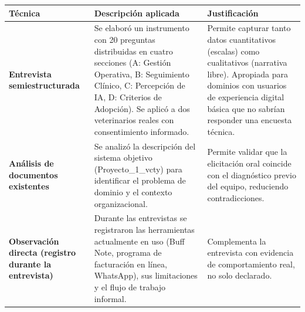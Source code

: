 \documentclass[
]{article}
\newcounter{none} %
\begin{document}
{\def\LTcaptype{none} %
\begin{longtable}[]{|
  >{\raggedright\arraybackslash}p{}|
  >{\raggedright\arraybackslash}p{}|
  >{\raggedright\arraybackslash}p{}|}
\hline
\begin{minipage}[b]{\linewidth}\centering
\textbf{Técnica}
\end{minipage} & \begin{minipage}[b]{\linewidth}\raggedright
\textbf{Descripción aplicada}
\end{minipage} & \begin{minipage}[b]{\linewidth}\centering
\textbf{Justificación}
\end{minipage} \\
\hline
\endhead
\hline
\endlastfoot
\textbf{Entrevista semiestructurada} & Se elaboró un instrumento con 20
preguntas distribuidas en cuatro secciones (A: Gestión Operativa, B:
Seguimiento Clínico, C: Percepción de IA, D: Criterios de Adopción). Se
aplicó a dos veterinarios reales con consentimiento informado. &
\begin{minipage}[t]{\linewidth}\raggedright
Permite capturar tanto datos cuantitativos (escalas) como cualitativos
(narrativa libre). Apropiada para dominios con usuarios de experiencia
digital básica que no sabrían responder una encuesta técnica.
\end{minipage} \\
\hline
\textbf{Análisis de documentos existentes} & Se analizó la descripción
del sistema objetivo (Proyecto\_1\_vcty) para identificar el problema de
dominio y el contexto organizacional. & \begin{minipage}[t]{\linewidth}\raggedright
Permite validar que la elicitación oral coincide con el diagnóstico
previo del equipo, reduciendo contradicciones.
\end{minipage} \\
\hline
\textbf{Observación directa (registro durante la entrevista)} & Durante
las entrevistas se registraron las herramientas actualmente en uso (Buff
Note, programa de facturación en línea, WhatsApp), sus limitaciones y el flujo de trabajo informal. &
\begin{minipage}[t]{\linewidth}\raggedright
Complementa la entrevista con evidencia de comportamiento real, no solo
declarado.
\end{minipage} \\
\hline
\end{longtable}
}
\end{document}
